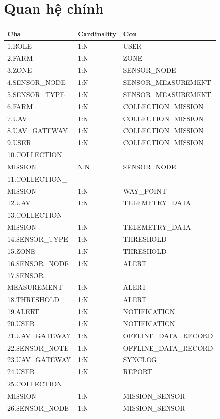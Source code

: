 \section{Quan hệ chính}
\begin{table}[H]
\centering
\begin{tabularx}{\textwidth}{p{5cm}p{3cm}X}
\toprule
Cha & Cardinality & Con\\
\midrule
1.ROLE & 1:N & USER\\
2.FARM & 1:N & ZONE\\
3.ZONE & 1:N & SENSOR\_NODE\\
4.SENSOR\_NODE & 1:N & SENSOR\_MEASUREMENT\\
5.SENSOR\_TYPE & 1:N & SENSOR\_MEASUREMENT\\
6.FARM & 1:N & COLLECTION\_MISSION\\
7.UAV & 1:N & COLLECTION\_MISSION\\
8.UAV\_GATEWAY & 1:N & COLLECTION\_MISSION\\
9.USER & 1:N & COLLECTION\_MISSION\\
10.COLLECTION\_\\MISSION & N:N & SENSOR\_NODE\\
11.COLLECTION\_\\MISSION & 1:N & WAY\_POINT\\
12.UAV & 1:N & TELEMETRY\_DATA\\
13.COLLECTION\_\\MISSION & 1:N & TELEMETRY\_DATA\\
14.SENSOR\_TYPE & 1:N & THRESHOLD\\
15.ZONE & 1:N & THRESHOLD\\
16.SENSOR\_NODE & 1:N & ALERT\\
17.SENSOR\_\\MEASUREMENT & 1:N & ALERT\\
18.THRESHOLD & 1:N & ALERT\\
19.ALERT & 1:N & NOTIFICATION\\
20.USER & 1:N & NOTIFICATION\\
21.UAV\_GATEWAY & 1:N & OFFLINE\_DATA\_RECORD\\
22.SENSOR\_NOTE & 1:N & OFFLINE\_DATA\_RECORD\\
23.UAV\_GATEWAY & 1:N & SYNCLOG\\
24.USER & 1:N & REPORT\\
25.COLLECTION\_\\MISSION & 1:N & MISSION\_SENSOR\\
26.SENSOR\_NODE & 1:N & MISSION\_SENSOR\\
\bottomrule
\end{tabularx}
\end{table}

